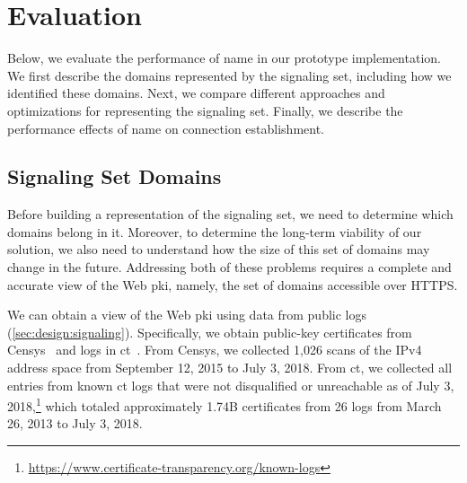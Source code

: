 \section{Evaluation}
\label{sec:evaluation}

Below, we evaluate the performance of \ac{name} in our prototype implementation.
We first describe the domains represented by the signaling set,
including how we identified these domains. Next, we compare different approaches
and optimizations for representing the signaling set. Finally, we describe the
performance effects of \ac{name} on connection establishment.

\subsection{Signaling Set Domains}
\label{sec:evaluation:https}

Before building a representation of the signaling set, we need to determine
which domains belong in it. Moreover, to determine the long-term viability of
our solution, we also need to understand how the size of this set of domains may
change in the future. Addressing both of these problems requires a complete and
accurate view of the Web \ac{pki}, namely, the set of domains accessible over
HTTPS.

We can obtain a view of the Web \ac{pki} using data from public logs (\autoref{sec:design:signaling}). 
Specifically, we obtain public-key
certificates from Censys~\cite{durumeric2015search} and logs in
\ac{ct}~\cite{rfc6962}. From Censys, we collected 1,026 scans of the IPv4
address space from September 12, 2015 to July 3, 2018.
From \ac{ct}, we collected all entries from known \ac{ct} logs that were not
disqualified or unreachable as of July 3,
2018,\footnote{\url{https://www.certificate-transparency.org/known-logs}} which
totaled approximately 1.74B certificates from 26 logs from
March 26, 2013 to July 3, 2018.


